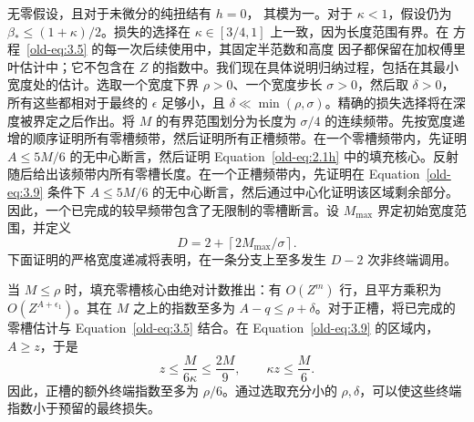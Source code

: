 \documentclass[11pt,a4paper]{article}
\numberwithin{equation}{section}
\numberwithin{figure}{section}
\theoremstyle{definition}
\theoremstyle{remark}
\begin{document}
无零假设，且对于未微分的纯扭结有 \(h=0\)，
其模为一。对于 \(\kappa<1\)，假设仍为
\(\beta_*\le(1+\kappa)/2\)。损失的选择在
\(\kappa\in[3/4,1]\) 上一致，因为长度范围有界。在
方程~\eqref{old-eq:3.5} 的每一次后续使用中，其固定半范数和高度
因子都保留在加权傅里叶估计中；它不包含在
\(Z\) 的指数中。我们现在具体说明归纳过程，包括在其最小宽度处的估计。选取一个宽度下界 \(\rho>0\)、一个宽度步长 \(\sigma>0\)，然后取 \(\delta>0\)，所有这些都相对于最终的 \(\epsilon\) 足够小，且 \(\delta\ll\min(\rho,\sigma)\)。精确的损失选择将在深度被界定之后作出。将 \(M\) 的有界范围划分为长度为 \(\sigma/4\) 的连续频带。先按宽度递增的顺序证明所有零槽频带，然后证明所有正槽频带。在一个零槽频带内，先证明 \(A\le5M/6\) 的无中心断言，然后证明 Equation~\eqref{old-eq:2.1h} 中的填充核心。反射随后给出该频带内所有零槽长度。在一个正槽频带内，先证明在 Equation~\eqref{old-eq:3.9} 条件下 \(A\le5M/6\) 的无中心断言，然后通过中心化证明该区域剩余部分。因此，一个已完成的较早频带包含了无限制的零槽断言。设 \(M_{\max}\) 界定初始宽度范围，并定义
\[
 D=2+\left\lceil 2M_{\max}/\sigma\right\rceil.
\]
下面证明的严格宽度递减将表明，在一条分支上至多发生 \(D-2\) 次非终端调用。

当 \(M\le\rho\) 时，填充零槽核心由绝对计数推出：有 \(O(Z^m)\) 行，且平方乘积为 \(O(Z^{A+\epsilon_1})\)。其在 \(M\) 之上的指数至多为 \(A-q\le\rho+\delta\)。对于正槽，将已完成的零槽估计与 Equation~\eqref{old-eq:3.5} 结合。在 Equation~\eqref{old-eq:3.9} 的区域内，\(A\ge z\)，于是
\begin{equation}
 z\le\frac{M}{6\kappa}\le\frac{2M}{9},
 \qquad \kappa z\le\frac M6.
 \label{old-eq:3.6}
\end{equation}
因此，正槽的额外终端指数至多为 \(\rho/6\)。通过选取充分小的 \(\rho,\delta\)，可以使这些终端指数小于预留的最终损失。
\end{document}

